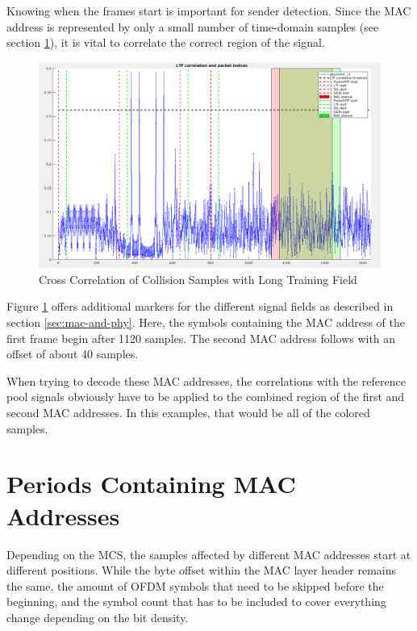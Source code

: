 Knowing when the frames start is important for sender detection. Since the MAC address is represented by only a small number of time-domain samples (see section \ref{sec:mac-periods}), it is vital to correlate the correct region of the signal.

\begin{figure}[H]
	\centering
	\includegraphics[width=\textwidth]{gfx/images/preamble-correlation}
	\caption{Cross Correlation of Collision Samples with Long Training Field}
	\label{fig:preamble-corr}
\end{figure}

Figure \ref{fig:preamble-corr} offers additional markers for the different signal fields as described in section \ref{sec:mac-and-phy}. Here, the symbols containing the MAC address of the first frame begin after 1120 samples. The second MAC address follows with an offset of about 40 samples.

When trying to decode these MAC addresses, the correlations with the reference pool signals obviously have to be applied to the combined region of the first and second MAC addresses. In this examples, that would be all of the colored samples.



\section{Periods Containing MAC Addresses}\label{sec:mac-periods}

Depending on the \gls{MCS}, the samples affected by different MAC addresses start at different positions. While the byte offset within the MAC layer header remains the same, the amount of OFDM symbols that need to be skipped before the beginning, and the symbol count that has to be included to cover everything change depending on the bit density.

